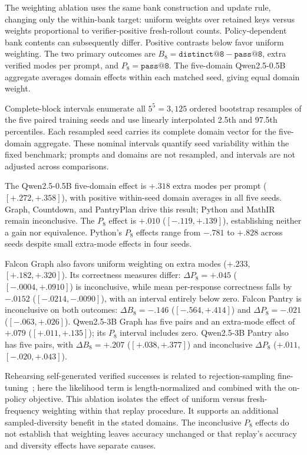 \documentclass{article}
\newcommand{\1}{\mathbf 1}
\theoremstyle{remark}
\theoremstyle{definition}
\theoremstyle{plain}
\begin{document}
The weighting ablation uses the same bank construction and update rule,
changing only the within-bank target: uniform weights over retained keys
versus weights proportional to verifier-positive fresh-rollout counts.
Policy-dependent bank contents can subsequently differ. Positive contrasts
below favor uniform weighting. The two primary outcomes are
$B_8=\texttt{distinct@8}-\texttt{pass@8}$, extra verified modes per prompt,
and $P_8=\texttt{pass@8}$. The five-domain Qwen2.5-0.5B aggregate averages
domain effects within each matched seed, giving equal domain weight.

Complete-block intervals enumerate all $5^5=3{,}125$ ordered bootstrap
resamples of the five paired training seeds and use linearly interpolated
2.5th and 97.5th percentiles. Each resampled seed carries its complete domain
vector for the five-domain aggregate. These nominal intervals quantify seed
variability within the fixed benchmark; prompts and domains are not resampled,
and intervals are not adjusted across comparisons.

The Qwen2.5-0.5B five-domain effect is $+.318$ extra modes per
prompt ($[+.272,+.358]$), with positive within-seed domain averages in all
five seeds. Graph, Countdown, and PantryPlan drive this result; Python and
MathIR remain inconclusive. The $P_8$ effect is $+.010$
($[-.119,+.139]$), establishing neither a gain nor equivalence. Python's
$P_8$ effects range from $-.781$ to $+.828$ across seeds despite
small extra-mode effects in four seeds.

Falcon Graph also favors uniform weighting on extra modes ($+.233$,
$[+.182,+.320]$). Its correctness measures differ: $\Delta P_8=+.045$
($[-.0004,+.0910]$) is inconclusive, while mean per-response correctness
falls by $-.0152$ ($[-.0214,-.0090]$), with an interval entirely below zero.
Falcon Pantry is inconclusive on both outcomes:
$\Delta B_8=-.146$ ($[-.564,+.414]$) and $\Delta P_8=-.021$
($[-.063,+.026]$). Qwen2.5-3B Graph has five pairs and an extra-mode effect of
$+.079$ ($[+.011,+.135]$); its $P_8$ interval includes zero.
Qwen2.5-3B Pantry also has five pairs, with $\Delta B_8=+.207$
($[+.038,+.377]$) and inconclusive $\Delta P_8$ ($+.011$, $[-.020,+.043]$).

Rehearsing self-generated verified successes is related to rejection-sampling
fine-tuning~\citep{dong2023raft}; here the likelihood term is length-normalized
and combined with the on-policy objective. This ablation isolates the effect
of uniform versus fresh-frequency weighting within that replay procedure.
It supports an additional sampled-diversity benefit in the stated domains.
The inconclusive $P_8$ effects do not establish that weighting leaves accuracy
unchanged or that replay's accuracy and diversity effects have separate causes.
\end{document}

